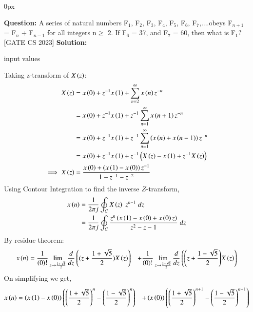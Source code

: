 \documentclass[journal,12pt]{IEEEtran}
\begin{document}
	\parindent 0px
	
	
	\title{}
	\author{EE23BTECH11209 - K S Ballvardhan$^{*}$
	}
	\maketitle
	\newpage
	\bigskip
	

 
	\textbf{Question:} A series of natural numbers F$_1$, F$_2$, F$_3$, F$_4$, F$_5$, F$_6$, F$_7$,....obeys F$_{n+1}$ = F$_n$ + F$_{n-1}$ for all integers n$\geq$ 2.
	If F$_6$ = 37, and F$_7$ = 60, then what is F$_1$? \hfill[GATE CS 2023]
        \textbf{Solution: }
	
	\begin{table}[ht] 
		\centering
		
		\caption{input values}
		\label{tab: Table2023cs3}
	\end{table}
	Taking z-transform of $X\left(z\right)$:
	\begin{align}
		X\left(z\right) &= x\left(0\right) + z^{-1} x\left(1\right) + \sum_{n=2}^{\infty} x\left(n\right) z^{-n}\\
	    &= x\left(0\right) + z^{-1} x\left(1\right) + z^{-1} \sum_{n=1}^{\infty} x\left(n+1\right) z^{-n}\\
	    &= x\left(0\right) + z^{-1} x\left(1\right) + z^{-1} \sum_{n=1}^{\infty} \left(x\left(n\right) + x\left(n-1\right)\right)z^{-n} \\
	    &= x\left(0\right) + z^{-1} x\left(1\right) + z^{-1}\left(X\left(z\right)-x\left(1\right) + z^{-1}X\left(z\right)\right) \\
		\implies X\left(z\right)&= \frac{x\left(0\right) + \left(x\left(1\right)-x\left(0\right)\right)z^{-1}}{1-z^{-1}-z^{-2}}
	\end{align}
	Using Contour Integration to find the inverse $Z$-transform,
	\begin{align}
		x\left(n\right) &=\frac{1}{2\pi j}\oint_{C} X\left(z\right) \;z^{n-1} \;dz  \\
		&=\frac{1}{2\pi j}\oint_{C}\frac{z^{n}\left(x\left(1\right)-x\left(0\right)+x\left(0\right) z\right)}{z^2-z-1} \;dz 
	\end{align}
	By residue theorem:
	\begin{align}
		x\left(n\right) &=\frac{1}{\left(0\right)!}\lim\limits_{z\to {\frac{1+\sqrt{5}}{2}}}\frac{d}{dz}\left({(z+\frac{1+\sqrt{5}}{2})}X\left(z\right)\right) &+ \frac{1}{\left(0\right)!}\lim\limits_{z\to \frac{1-\sqrt{5}}{2}}\frac{d}{dz}\left({\left(z+\frac{1-\sqrt{5}}{2}\right)}X\left(z\right)\right)
	\end{align}
	On simplifying we get,
	\begin{align}
		x\left(n\right) &= \left(x\left(1\right)-x\left(0\right)\right)\left(\left(\frac{1+\sqrt{5}}{2}\right)^n-\left(\frac{1-\sqrt{5}}{2}\right)^n\right) &+ \left(x\left(0\right)\right)\left(\left(\frac{1+\sqrt{5}}{2}\right)^{n+1}-\left(\frac{1-\sqrt{5}}{2}\right)^{n+1}\right)
	\end{align}
\end{document}
